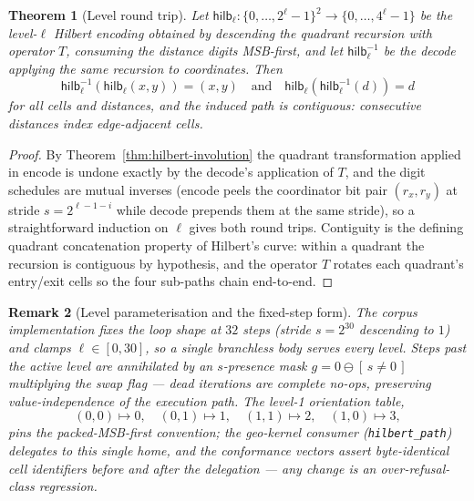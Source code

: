 \documentclass[11pt,a4paper]{report}
\newtheorem{theorem}{Theorem}[chapter]
\newtheorem{remark}[theorem]{Remark}
\newcommand{\sel}[1]{\left[\,#1\,\right]}
\begin{document}
\begin{theorem}[Level round trip]\label{thm:hilbert-roundtrip}
Let $\mathsf{hilb}_{\ell} : \{0,\dots,2^{\ell}-1\}^2 \to
\{0, \dots, 4^{\ell}-1\}$ be the level-$\ell$ Hilbert encoding obtained
by descending the quadrant recursion with operator $T$, consuming the
distance digits MSB-first, and let $\mathsf{hilb}^{-1}_{\ell}$ be the
decode applying the same recursion to coordinates. Then
\begin{equation}
\mathsf{hilb}^{-1}_{\ell}\!\left(\mathsf{hilb}_{\ell}(x,y)\right) = (x,y)
\quad\text{and}\quad
\mathsf{hilb}_{\ell}\!\left(\mathsf{hilb}^{-1}_{\ell}(d)\right) = d
\end{equation}
for all cells and distances, and the induced path is \emph{contiguous}:
consecutive distances index edge-adjacent cells.
\end{theorem}

\begin{proof}
By Theorem~\ref{thm:hilbert-involution} the quadrant transformation
applied in encode is undone exactly by the decode's application of $T$,
and the digit schedules are mutual inverses (encode peels the
coordinator bit pair $(r_x, r_y)$ at stride $s = 2^{\ell - 1 - i}$
while decode prepends them at the same stride), so a straightforward
induction on $\ell$ gives both round trips. Contiguity is the defining
quadrant concatenation property of Hilbert's curve: within a quadrant
the recursion is contiguous by hypothesis, and the operator $T$ rotates
each quadrant's entry/exit cells so the four sub-paths chain
end-to-end.
\end{proof}

\begin{remark}[Level parameterisation and the fixed-step form]
The corpus implementation fixes the loop shape at $32$ steps (stride
$s = 2^{30}$ descending to $1$) and clamps $\ell \in [0, 30]$, so a
single branchless body serves every level. Steps past the active level
are annihilated by an $s$-presence mask
$g = 0 \ominus \sel{s \neq 0}$ multiplying the swap flag --- dead
iterations are complete no-ops, preserving value-independence of the
execution path. The level-1 orientation table,
\begin{equation}
(0,0) \mapsto 0,\quad (0,1) \mapsto 1,\quad (1,1) \mapsto 2,\quad
(1,0) \mapsto 3,
\end{equation}
pins the packed-MSB-first convention; the geo-kernel consumer
(\texttt{hilbert\_path}) delegates to this single home, and the
conformance vectors assert byte-identical cell identifiers before and
after the delegation --- any change is an over-refusal-class regression.
\end{remark}
\end{document}
